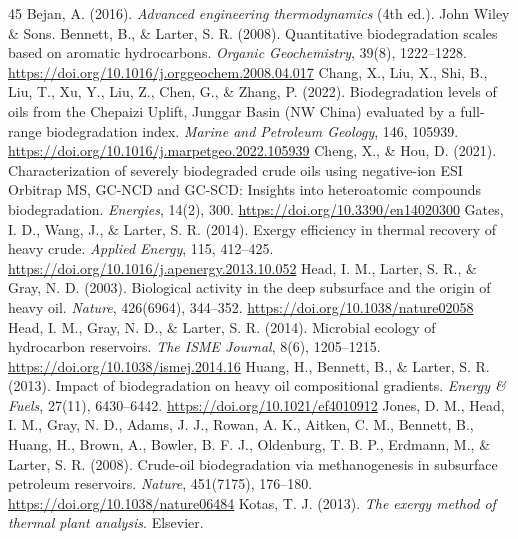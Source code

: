 \documentclass[review,12pt]{elsarticle}
\begin{document}
\begin{thebibliography}{45}
 Bejan, A. (2016). \textit{Advanced engineering thermodynamics} (4th ed.). John Wiley \& Sons.
 Bennett, B., \& Larter, S. R. (2008). Quantitative biodegradation scales based on aromatic hydrocarbons. \textit{Organic Geochemistry}, 39(8), 1222--1228. \url{https://doi.org/10.1016/j.orggeochem.2008.04.017}
 Chang, X., Liu, X., Shi, B., Liu, T., Xu, Y., Liu, Z., Chen, G., \& Zhang, P. (2022). Biodegradation levels of oils from the Chepaizi Uplift, Junggar Basin (NW China) evaluated by a full-range biodegradation index. \textit{Marine and Petroleum Geology}, 146, 105939. \url{https://doi.org/10.1016/j.marpetgeo.2022.105939}
 Cheng, X., \& Hou, D. (2021). Characterization of severely biodegraded crude oils using negative-ion ESI Orbitrap MS, GC-NCD and GC-SCD: Insights into heteroatomic compounds biodegradation. \textit{Energies}, 14(2), 300. \url{https://doi.org/10.3390/en14020300}
 Gates, I. D., Wang, J., \& Larter, S. R. (2014). Exergy efficiency in thermal recovery of heavy crude. \textit{Applied Energy}, 115, 412--425. \url{https://doi.org/10.1016/j.apenergy.2013.10.052}
 Head, I. M., Larter, S. R., \& Gray, N. D. (2003). Biological activity in the deep subsurface and the origin of heavy oil. \textit{Nature}, 426(6964), 344--352. \url{https://doi.org/10.1038/nature02058}
 Head, I. M., Gray, N. D., \& Larter, S. R. (2014). Microbial ecology of hydrocarbon reservoirs. \textit{The ISME Journal}, 8(6), 1205--1215. \url{https://doi.org/10.1038/ismej.2014.16}
 Huang, H., Bennett, B., \& Larter, S. R. (2013). Impact of biodegradation on heavy oil compositional gradients. \textit{Energy \& Fuels}, 27(11), 6430--6442. \url{https://doi.org/10.1021/ef4010912}
 Jones, D. M., Head, I. M., Gray, N. D., Adams, J. J., Rowan, A. K., Aitken, C. M., Bennett, B., Huang, H., Brown, A., Bowler, B. F. J., Oldenburg, T. B. P., Erdmann, M., \& Larter, S. R. (2008). Crude-oil biodegradation via methanogenesis in subsurface petroleum reservoirs. \textit{Nature}, 451(7175), 176--180. \url{https://doi.org/10.1038/nature06484}
 Kotas, T. J. (2013). \textit{The exergy method of thermal plant analysis}. Elsevier.

\end{thebibliography}
\end{document}
